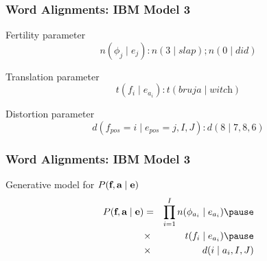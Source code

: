 \begin{frame}
\frametitle{Word Alignments: IBM Model 3}
\begin{block}{Fertility parameter}
\[ n(\phi_j \mid e_j) : n(3 \mid \textit{slap}) ; n(0 \mid \textit{did}) \]
\end{block}\pause
\begin{block}{Translation parameter}
\[ t(f_i \mid e_{a_i}) : t(\textit{bruja} \mid \textit{witch}) \]
\end{block}\pause
\begin{block}{Distortion parameter}
\[ d(f_{\textit{pos}} = i \mid e_{\textit{pos}} = j, I, J) : d(8 \mid 7, 8, 6) \]
\end{block}
\end{frame}

\begin{frame}
\frametitle{Word Alignments: IBM Model 3}
\begin{block}{Generative model for $P(\textbf{f}, \textbf{a} \mid \textbf{e})$}
\begin{eqnarray*}
P(\src, \aln \mid \tgt) & = & \prod_{i=1}^I n(\phi_{a_i} \mid e_{a_i})  \pause\\
& \times & t(f_i \mid e_{a_i}) \pause\\
& \times & d(i \mid a_i, I, J)
\end{eqnarray*}
\end{block}
\end{frame}


